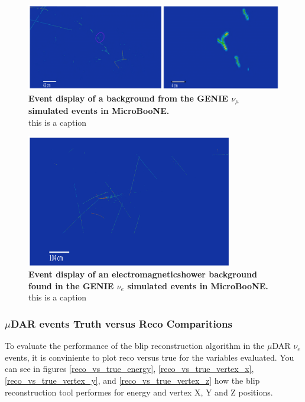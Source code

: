 \begin{figure}[h!]
    \centering
    \includegraphics[width=120mm]{Figures/numu_evd.jpeg}
    \caption[Event display of a background from the GENIE $\nu_{\mu}$ simulated event in MicroBooNE.]{{\textbf{Event display of a background from the GENIE $\nu_{\mu}$ simulated events in MicroBooNE.}}\\ this is a caption}
    \label{bkg_evd_2}
\end{figure}

\begin{figure}[h!]
    \centering
    \includegraphics[width=90mm]{Figures/shower_evd_2.png}
    \caption[Event display of a background from the GENIE $\nu_{\mu}$ simulated events in MicroBooNE.]{{\textbf{Event display of an electromagneticshower background found in the GENIE $\nu_{e}$ simulated events in MicroBooNE.}}\\ this is a caption}
    \label{bkg_evd_3}
\end{figure}


\subsubsection{$\mu$DAR events Truth versus Reco Comparitions}

To evaluate the performance of the blip reconstruction algorithm in the $\mu$DAR $\nu_e$ events, it is conviniente to plot reco versus true for the variables evaluated. You can see in figures \ref{reco_vs_true_energy}, \ref{reco_vs_true_vertex_x}, \ref{reco_vs_true_vertex_y}, and \ref{reco_vs_true_vertex_z} how the blip reconstruction tool performes for energy and vertex X, Y and Z positions.

